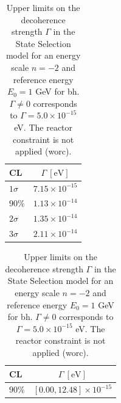 %
\begin{table}[htbp]
\centering
\caption{Upper limits on the decoherence strength $\Gamma$ in the State Selection model for an energy scale $n=-2$ and reference energy $E_0 = 1$ GeV for \acrlong{bh}. $\Gamma \neq 0$ corresponds to $\Gamma = 5.0\times10^{-15}$ eV. The reactor constraint is not applied (\acrshort{worc}).}
\begin{tabular}{|l|c|}
\hline
\rule{0pt}{2.5ex} CL & $\Gamma \ [\text{eV}]$ \\
\hline
$1\sigma$ & $7.15 \times 10^{-15}$ \\
$90\%$    & $1.13 \times 10^{-14}$ \\
$2\sigma$ & $1.35 \times 10^{-14}$ \\
$3\sigma$ & $2.11 \times 10^{-14}$ \\
\hline
\end{tabular}
\end{table}
%

%
\begin{table}[htbp]
\centering
\caption{Upper limits on the decoherence strength $\Gamma$ in the State Selection model for an energy scale $n=-2$ and reference energy $E_0 = 1$ GeV for \acrlong{bh}. $\Gamma \neq 0$ corresponds to $\Gamma = 5.0\times10^{-15}$ eV. The reactor constraint is not applied (\acrshort{worc}).}
\begin{tabular}{|l|c|}
\hline
\rule{0pt}{2.5ex} CL & $\Gamma \ [\text{eV}]$ \\
\hline
$90\%$    & $[0.00, 12.48]\times 10^{-15}$ \\
\hline
\end{tabular}
\end{table}
%

